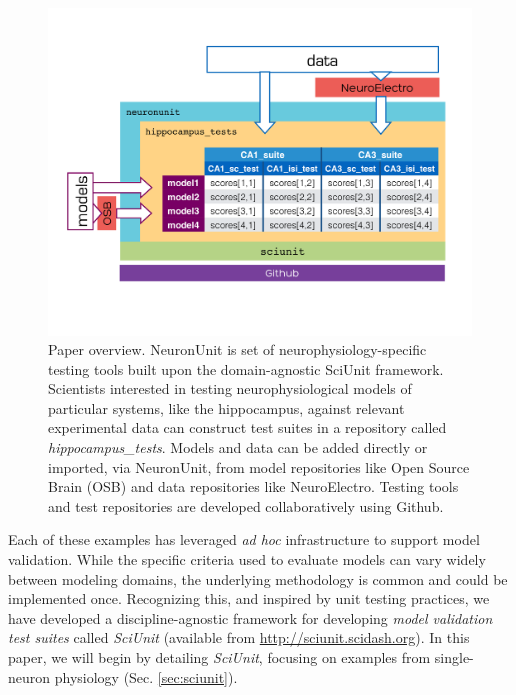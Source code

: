 \documentclass{frontiersSCNS}
\begin{document}
\begin{figure}
\vspace{-45px}
\centering
\includegraphics[scale=0.6]{diagram1.pdf}
\vspace{-65px}
\caption{Paper overview. NeuronUnit is set of neurophysiology-specific testing tools built upon the domain-agnostic SciUnit framework. 
Scientists interested in testing neurophysiological models of particular systems, like the hippocampus, against relevant experimental data can construct test suites in a repository called \textit{hippocampus\_tests}. 
Models and data can be added directly or imported, via NeuronUnit, from model repositories like Open Source Brain (OSB) and data repositories like NeuroElectro. 
Testing tools and test repositories are developed collaboratively using Github.}  
\label{fig:sciunit_overview}\vspace{-10px}
\end{figure}
\leavevmode


Each of these examples has leveraged \emph{ad hoc} infrastructure to support model validation. 
While the specific criteria used to evaluate models can vary widely between modeling domains, the underlying methodology is common and could be implemented once. 
Recognizing this, and inspired by unit testing practices, we have developed a discipline-agnostic framework for developing \emph{model validation test suites} called \textit{SciUnit} \citep{omar_sciunit_2013} (available from \url{http://sciunit.scidash.org}). 
In this paper, we will begin by detailing \textit{SciUnit}, focusing on examples from single-neuron physiology (Sec. \ref{sec:sciunit}). 
\end{document}
